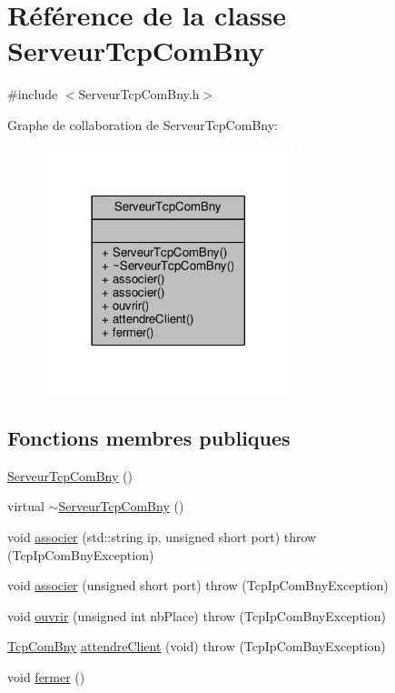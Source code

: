 \hypertarget{classServeurTcpComBny}{}\section{Référence de la classe Serveur\+Tcp\+Com\+Bny}
\label{classServeurTcpComBny}


{\ttfamily \#include $<$Serveur\+Tcp\+Com\+Bny.\+h$>$}



Graphe de collaboration de Serveur\+Tcp\+Com\+Bny\+:
\nopagebreak
\begin{figure}[H]
\begin{center}
\leavevmode
\includegraphics[width=206pt]{classServeurTcpComBny__coll__graph}
\end{center}
\end{figure}
\subsection*{Fonctions membres publiques}
\begin{DoxyCompactItemize}
\item 
\hyperlink{classServeurTcpComBny_a65916eb9474cb2f146c5ef28ecb85e0b}{Serveur\+Tcp\+Com\+Bny} ()
\item 
virtual \hyperlink{classServeurTcpComBny_ac47c788fc3b1eac2bba2ec2f8f4c4e73}{$\sim$\+Serveur\+Tcp\+Com\+Bny} ()
\item 
void \hyperlink{classServeurTcpComBny_aae731332a0c168742caf25f4dbd19085}{associer} (std\+::string ip, unsigned short port)  throw (\+Tcp\+Ip\+Com\+Bny\+Exception)
\item 
void \hyperlink{classServeurTcpComBny_a72d6e3e0f3aa7a8b644032fdd225511b}{associer} (unsigned short port)  throw (\+Tcp\+Ip\+Com\+Bny\+Exception)
\item 
void \hyperlink{classServeurTcpComBny_a56d281ce53adc63348180b19c9eac759}{ouvrir} (unsigned int nb\+Place)  throw (\+Tcp\+Ip\+Com\+Bny\+Exception)
\item 
\hyperlink{classTcpComBny}{Tcp\+Com\+Bny} \hyperlink{classServeurTcpComBny_af1bf04352fee181c5575cbec1f0da8f1}{attendre\+Client} (void)  throw (\+Tcp\+Ip\+Com\+Bny\+Exception)
\item 
void \hyperlink{classServeurTcpComBny_af73cb54b2510fdd3c0f691088dfc37aa}{fermer} ()
\end{DoxyCompactItemize}



